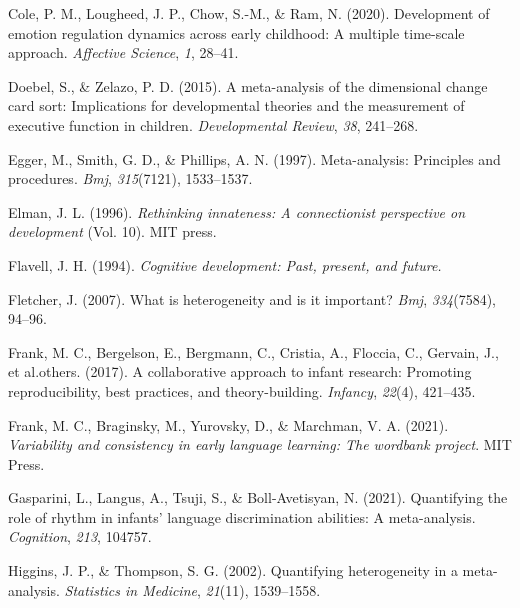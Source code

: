 \documentclass[
  man]{apa6}
\newlength{\cslhangindent}
\newlength{\cslentryspacingunit} %
\newenvironment{CSLReferences}[2] %
 {%
  \setlength{\parindent}{0pt}
  \ifodd #1
  \let\oldpar\par
  \def\par{\hangindent=\cslhangindent\oldpar}
  \fi
  \setlength{\parskip}{#2\cslentryspacingunit}
 }%
 {}
\begin{document}
\begin{CSLReferences}{1}{0}
\leavevmode{}%
Cole, P. M., Lougheed, J. P., Chow, S.-M., \& Ram, N. (2020). Development of emotion regulation dynamics across early childhood: A multiple time-scale approach. \emph{Affective Science}, \emph{1}, 28--41.

\leavevmode{}%
Doebel, S., \& Zelazo, P. D. (2015). A meta-analysis of the dimensional change card sort: Implications for developmental theories and the measurement of executive function in children. \emph{Developmental Review}, \emph{38}, 241--268.

\leavevmode{}%
Egger, M., Smith, G. D., \& Phillips, A. N. (1997). Meta-analysis: Principles and procedures. \emph{Bmj}, \emph{315}(7121), 1533--1537.

\leavevmode{}%
Elman, J. L. (1996). \emph{Rethinking innateness: A connectionist perspective on development} (Vol. 10). MIT press.

\leavevmode{}%
Flavell, J. H. (1994). \emph{Cognitive development: Past, present, and future.}

\leavevmode{}%
Fletcher, J. (2007). What is heterogeneity and is it important? \emph{Bmj}, \emph{334}(7584), 94--96.

\leavevmode{}%
Frank, M. C., Bergelson, E., Bergmann, C., Cristia, A., Floccia, C., Gervain, J., et al.others. (2017). A collaborative approach to infant research: Promoting reproducibility, best practices, and theory-building. \emph{Infancy}, \emph{22}(4), 421--435.

\leavevmode{}%
Frank, M. C., Braginsky, M., Yurovsky, D., \& Marchman, V. A. (2021). \emph{Variability and consistency in early language learning: The wordbank project}. MIT Press.

\leavevmode{}%
Gasparini, L., Langus, A., Tsuji, S., \& Boll-Avetisyan, N. (2021). Quantifying the role of rhythm in infants' language discrimination abilities: A meta-analysis. \emph{Cognition}, \emph{213}, 104757.

\leavevmode{}%
Higgins, J. P., \& Thompson, S. G. (2002). Quantifying heterogeneity in a meta-analysis. \emph{Statistics in Medicine}, \emph{21}(11), 1539--1558.


\end{CSLReferences}
\end{document}
